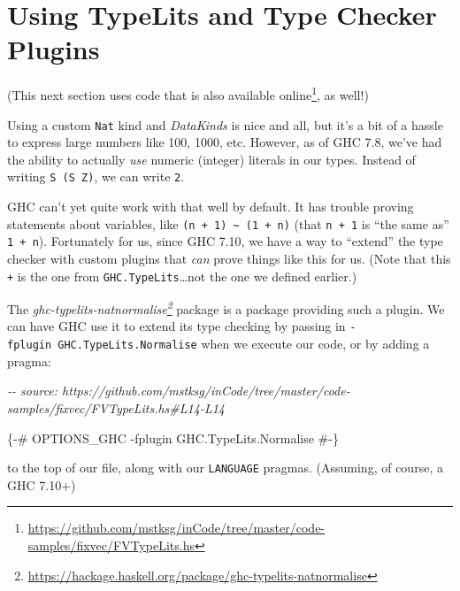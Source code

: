\documentclass[]{article}
\newenvironment{Shaded}{}{}
\newcommand{\CommentTok}[1]{\textcolor[rgb]{0.38,0.63,0.69}{\textit{#1}}}
\newcommand{\OtherTok}[1]{\textcolor[rgb]{0.00,0.44,0.13}{#1}}
\renewcommand{\href}[2]{#2\footnote{\url{#1}}}
\begin{document}
\hypertarget{using-typelits-and-type-checker-plugins}{%
\section{Using TypeLits and Type Checker
Plugins}\label{using-typelits-and-type-checker-plugins}}

(This next section uses code that is
\href{https://github.com/mstksg/inCode/tree/master/code-samples/fixvec/FVTypeLits.hs}{also
available online}, as well!)

Using a custom \texttt{Nat} kind and \emph{DataKinds} is nice and all, but it's
a bit of a hassle to express large numbers like 100, 1000, etc. However, as of
GHC 7.8, we've had the ability to actually \emph{use} numeric (integer) literals
in our types. Instead of writing \texttt{S\ (S\ Z)}, we can write \texttt{2}.

GHC can't yet quite work with that well by default. It has trouble proving
statements about variables, like
\texttt{(n\ +\ 1)\ \textasciitilde{}\ (1\ +\ n)} (that \texttt{n\ +\ 1} is ``the
same as'' \texttt{1\ +\ n}). Fortunately for us, since GHC 7.10, we have a way
to ``extend'' the type checker with custom plugins that \emph{can} prove things
like this for us. (Note that this \texttt{+} is the one from
\texttt{GHC.TypeLits}\ldots not the one we defined earlier.)

The
\emph{\href{https://hackage.haskell.org/package/ghc-typelits-natnormalise}{ghc-typelits-natnormalise}}
package is a package providing such a plugin. We can have GHC use it to extend
its type checking by passing in \texttt{-fplugin\ GHC.TypeLits.Normalise} when
we execute our code, or by adding a pragma:

\begin{Shaded}
\begin{Highlighting}[]
\CommentTok{{-}{-} source: https://github.com/mstksg/inCode/tree/master/code{-}samples/fixvec/FVTypeLits.hs\#L14{-}L14}

\OtherTok{\{{-}\# OPTIONS\_GHC {-}fplugin GHC.TypeLits.Normalise \#{-}\}}
\end{Highlighting}
\end{Shaded}

to the top of our file, along with our \texttt{LANGUAGE} pragmas. (Assuming, of
course, a GHC 7.10+)
\end{document}

